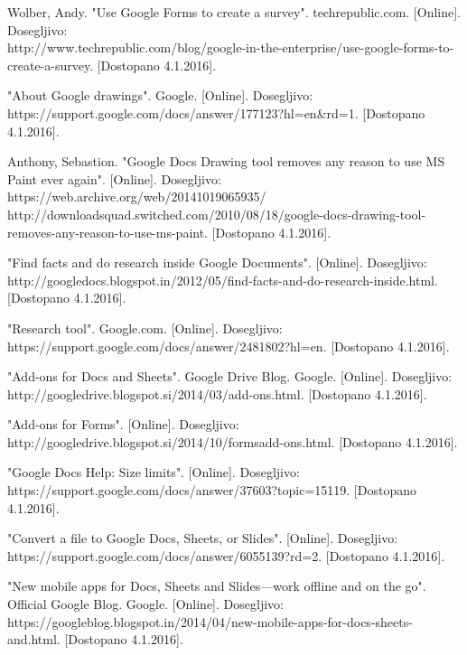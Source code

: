 \documentclass[a4paper, 12pt]{book}
\begin{document}
\begin{thebibliography}{99}
 Wolber, Andy. "Use Google Forms to create a survey". techrepublic.com.
[Online]. Dosegljivo:\\ http://www.techrepublic.com/blog/google-in-the-enterprise/use-google-forms-to-create-a-survey.
[Dostopano 4.1.2016].


 "About Google drawings". Google.
[Online]. Dosegljivo:\\ https://support.google.com/docs/answer/177123?hl=en\&rd=1.
[Dostopano 4.1.2016].
 
 Anthony, Sebastion. "Google Docs Drawing tool removes any reason to use MS Paint ever again".
[Online]. Dosegljivo:\\ https://web.archive.org/web/20141019065935/
http://downloadsquad.switched.com/2010/08/18/google-docs-drawing-tool-removes-any-reason-to-use-ms-paint.
[Dostopano 4.1.2016].

 "Find facts and do research inside Google Documents". 
[Online]. Dosegljivo:\\ http://googledocs.blogspot.in/2012/05/find-facts-and-do-research-inside.html.
[Dostopano 4.1.2016].

 "Research tool". Google.com. 
[Online]. Dosegljivo:\\ https://support.google.com/docs/answer/2481802?hl=en.
[Dostopano 4.1.2016].

 "Add-ons for Docs and Sheets". Google Drive Blog. Google.
[Online]. Dosegljivo:\\ http://googledrive.blogspot.si/2014/03/add-ons.html.
[Dostopano 4.1.2016].

 "Add-ons for Forms". 
[Online]. Dosegljivo:\\ http://googledrive.blogspot.si/2014/10/formsadd-ons.html.
[Dostopano 4.1.2016].

 "Google Docs Help: Size limits". 
[Online]. Dosegljivo:\\ https://support.google.com/docs/answer/37603?topic=15119.
[Dostopano 4.1.2016].

 "Convert a file to Google Docs, Sheets, or Slides". 
[Online]. Dosegljivo:\\ https://support.google.com/docs/answer/6055139?rd=2.
[Dostopano 4.1.2016].

 "New mobile apps for Docs, Sheets and Slides—work offline and on the go". Official Google Blog. Google.
[Online]. Dosegljivo:\\ https://googleblog.blogspot.in/2014/04/new-mobile-apps-for-docs-sheets-and.html.
[Dostopano 4.1.2016].


\end{thebibliography}
\end{document}
